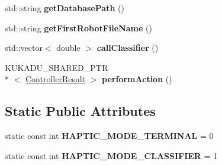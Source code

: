\begin{DoxyCompactItemize}
\item 
\hypertarget{classkukadu_1_1SensingController_abe59136d736a9fafdd6b8281982a4e0c}{std\-::string {\bfseries get\-Database\-Path} ()}\label{classkukadu_1_1SensingController_abe59136d736a9fafdd6b8281982a4e0c}

\item 
\hypertarget{classkukadu_1_1SensingController_a9d11ad0c9456cb4a619fea2fa4b2f8ee}{std\-::string {\bfseries get\-First\-Robot\-File\-Name} ()}\label{classkukadu_1_1SensingController_a9d11ad0c9456cb4a619fea2fa4b2f8ee}

\item 
\hypertarget{classkukadu_1_1SensingController_a22850dd6c798fedc71a66273c7d9d35e}{std\-::vector$<$ double $>$ {\bfseries call\-Classifier} ()}\label{classkukadu_1_1SensingController_a22850dd6c798fedc71a66273c7d9d35e}

\item 
\hypertarget{classkukadu_1_1SensingController_ac81da3f89729bc7129343e0030ca2d0d}{K\-U\-K\-A\-D\-U\-\_\-\-S\-H\-A\-R\-E\-D\-\_\-\-P\-T\-R\\*
$<$ \hyperlink{classkukadu_1_1ControllerResult}{Controller\-Result} $>$ {\bfseries perform\-Action} ()}\label{classkukadu_1_1SensingController_ac81da3f89729bc7129343e0030ca2d0d}

\end{DoxyCompactItemize}
\subsection*{Static Public Attributes}
\begin{DoxyCompactItemize}
\item 
\hypertarget{classkukadu_1_1SensingController_acad6c7b0b6090e0cfe9e00bbfbb50703}{static const int {\bfseries H\-A\-P\-T\-I\-C\-\_\-\-M\-O\-D\-E\-\_\-\-T\-E\-R\-M\-I\-N\-A\-L} = 0}\label{classkukadu_1_1SensingController_acad6c7b0b6090e0cfe9e00bbfbb50703}

\item 
\hypertarget{classkukadu_1_1SensingController_a147d51f3bbf9f4db6ba670a294075fef}{static const int {\bfseries H\-A\-P\-T\-I\-C\-\_\-\-M\-O\-D\-E\-\_\-\-C\-L\-A\-S\-S\-I\-F\-I\-E\-R} = 1}\label{classkukadu_1_1SensingController_a147d51f3bbf9f4db6ba670a294075fef}

\end{DoxyCompactItemize}

